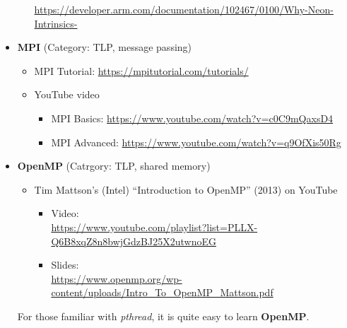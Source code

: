 \documentclass{article}
\begin{document}
\begin{itemize}
\begin{itemize}
        \href{https://developer.arm.com/documentation/102467/0100/Why-Neon-Intrinsics-}{https://developer.arm.com/documentation/102467/0100/Why-Neon-Intrinsics-}
    \end{itemize}
    \item \textbf{MPI} (Category: TLP, message passing)
    \begin{itemize}
        \item MPI Tutorial:
        \href{https://mpitutorial.com/tutorials/}{https://mpitutorial.com/tutorials/}
        \item YouTube video
        \begin{itemize}
            \item MPI Basics:
            \href{https://www.youtube.com/watch?v=c0C9mQaxsD4}{https://www.youtube.com/watch?v=c0C9mQaxsD4}
            \item MPI Advanced:
            \href{https://www.youtube.com/watch?v=q9OfXis50Rg}{https://www.youtube.com/watch?v=q9OfXis50Rg}
        \end{itemize}
    \end{itemize}
    \item \textbf{OpenMP} (Catrgory: TLP, shared memory)
    \begin{itemize}
        \item Tim Mattson’s (Intel) “Introduction to OpenMP” (2013) on YouTube
        \begin{itemize}
            \item Video:\\
            \href{https://www.youtube.com/playlist?list=PLLX-Q6B8xqZ8n8bwjGdzBJ25X2utwnoEG}{https://www.youtube.com/playlist?list=PLLX-Q6B8xqZ8n8bwjGdzBJ25X2utwnoEG}
            \item Slides:\\
            \href{https://www.openmp.org/wp-content/uploads/Intro\_To\_OpenMP\_Mattson.pdf}{https://www.openmp.org/wp-content/uploads/Intro\_To\_OpenMP\_Mattson.pdf}
        \end{itemize}
    \end{itemize}
    For those familiar with \emph{pthread}, it is quite easy to learn \textbf{OpenMP}.
\end{itemize}
\end{document}

